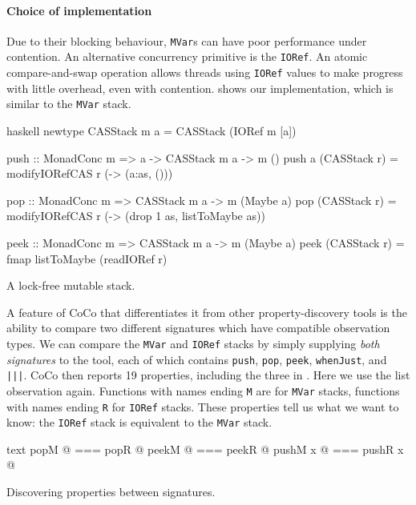 \paragraph{Choice of implementation}
Due to their blocking behaviour, \verb|MVar|s can have poor
performance under contention.  An alternative concurrency primitive is
the \verb|IORef|.  An atomic compare-and-swap operation allows threads
using \verb|IORef| values to make progress with little overhead, even
with contention.   shows our implementation, which
is similar to the \verb|MVar| stack.

\begin{listing}
\centering
\begin{cminted}{haskell}
newtype CASStack m a = CASStack (IORef m [a])

push :: MonadConc m => a -> CASStack m a -> m ()
push a (CASStack r) = modifyIORefCAS r (\as -> (a:as, ()))

pop :: MonadConc m => CASStack m a -> m (Maybe a)
pop (CASStack r) = modifyIORefCAS r (\as -> (drop 1 as, listToMaybe as))

peek :: MonadConc m => CASStack m a -> m (Maybe a)
peek (CASStack r) = fmap listToMaybe (readIORef r)
\end{cminted}
\caption{A lock-free mutable stack.}
\label{lst:crefstack}
\end{listing}

A feature of CoCo that differentiates it from other property-discovery
tools is the ability to compare two different signatures which have
compatible observation types.  We can compare the \verb|MVar| and
\verb|IORef| stacks by simply supplying \emph{both signatures} to the
tool, each of which contains \verb|push|, \verb|pop|, \verb|peek|,
\verb|whenJust|, and \verb#|||#.  CoCo then reports 19 properties,
including the three in .  Here we use the list
observation again.  Functions with names ending \verb|M| are for
\verb|MVar| stacks, functions with names ending \verb|R| for
\verb|IORef| stacks.  These properties tell us what we want to know:
the \verb|IORef| stack is equivalent to the \verb|MVar| stack.

\begin{listing}
\centering
\begin{cminted}{text}
   popM @  ===  popR @
  peekM @  ===  peekR @
pushM x @  ===  pushR x @
\end{cminted}
\caption{Discovering properties between signatures.}\label{lst:stacks}
\end{listing}

